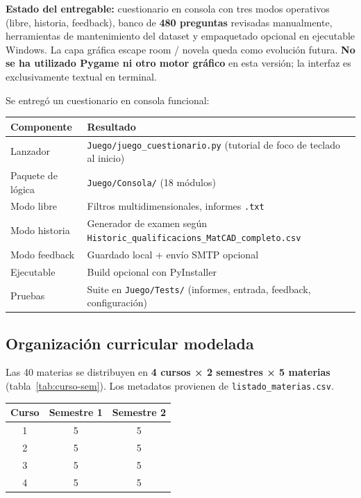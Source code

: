 \documentclass[11pt,a4paper]{article}
\newcommand{\iniciotabla}{\par\medskip\renewcommand{\arraystretch}{1.12}}
\newcommand{\fintabla}{\par\medskip}
\begin{document}
\textbf{Estado del entregable:} cuestionario en consola con tres modos operativos (libre, historia, feedback), banco de \textbf{480 preguntas} revisadas manualmente, herramientas de mantenimiento del dataset y empaquetado opcional en ejecutable Windows. La capa gráfica escape room / novela queda como evolución futura. \textbf{No se ha utilizado Pygame ni otro motor gráfico} en esta versión; la interfaz es exclusivamente textual en terminal.

Se entregó un cuestionario en consola funcional:

\begin{tabular}{@{}lp{8cm}@{}}
\toprule
\textbf{Componente} & \textbf{Resultado} \\
\midrule
Lanzador & \texttt{Juego/juego\_cuestionario.py} (tutorial de foco de teclado al inicio) \\
Paquete de lógica & \texttt{Juego/Consola/} (18 módulos) \\
Modo libre & Filtros multidimensionales, informes \texttt{.txt} \\
Modo historia & Generador de examen según \texttt{Historic\_qualificacions\_MatCAD\_completo.csv} \\
Modo feedback & Guardado local + envío SMTP opcional \\
Ejecutable & Build opcional con PyInstaller \\
Pruebas & Suite en \texttt{Juego/Tests/} (informes, entrada, feedback, configuración) \\
\bottomrule
\end{tabular}

\subsection{Organización curricular modelada}

Las 40 materias se distribuyen en \textbf{4 cursos × 2 semestres × 5 materias} (tabla~\ref{tab:curso-sem}). Los metadatos provienen de \texttt{listado\_materias.csv}.

\iniciotabla
\begin{tabular}{@{}ccc@{}}
\toprule
\textbf{Curso} & \textbf{Semestre 1} & \textbf{Semestre 2} \\
\midrule
1 & 5 & 5 \\
2 & 5 & 5 \\
3 & 5 & 5 \\
4 & 5 & 5 \\
\bottomrule
\end{tabular}
\label{tab:curso-sem}
\fintabla
\end{document}
